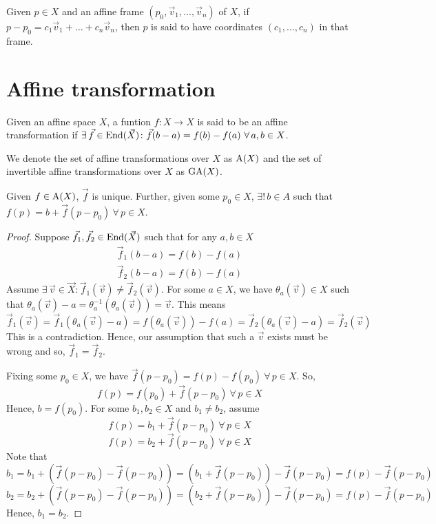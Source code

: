 \noindent
Given $p \in X$ and an affine frame $(p_0,\vec{v}_1,\dots,\vec{v}_n)$ of $X$, if
$p-p_0=c_1\vec{v}_1+\dots+c_n\vec{v}_n$, then $p$ is said to have coordinates
$(c_1,\dots,c_n)$ in that frame.

\section{Affine transformation}

\begin{definition}
    Given an affine space $X$, a funtion $f\colon X \to X$ is said to be an affine
    transformation if $\exists\,\vec{f}\in\operatorname{End}(\vec{X})\colon \vec{f}(b-a)=f(b)-f(a)\ \forall\,a,b \in X$.
\end{definition}

\begin{notation}
    We denote the set of affine transformations over $X$ as $\operatorname{A}(X)$ and the set of
    invertible affine transformations over $X$ as $\operatorname{GA}(X)$.
\end{notation}

\begin{theorem} \label{thm:aff_lin_rep}
    Given $f\in\operatorname{A}(X)$, $\vec{f}$ is unique. Further, given some $p_0 \in X$,
    $\exists!\,b\in{A}$ such that $f(p)=b+\vec{f}(p-p_0)\ \forall\,p \in X$.
\end{theorem}

\begin{proof}
    Suppose $\vec{f}_1,\vec{f}_2\in\operatorname{End}(\vec{X})$ such that for any $a,b \in X$
    \begin{align*}
        \vec{f}_1(b-a)=f(b)-f(a) \\
        \vec{f}_2(b-a)=f(b)-f(a)
    \end{align*}
    Assume $\exists\,\vec{v}\in\vec{X}\colon \vec{f}_1(\vec{v})\neq\vec{f}_2(\vec{v})$.
    For some $a \in X$, we have $\theta_a(\vec{v}) \in X$ such that
    $\theta_a(\vec{v})-a=\theta_a^{-1}(\theta_a(\vec{v}))=\vec{v}$. This means
    \[
        \vec{f}_1(\vec{v}) = \vec{f}_1(\theta_a(\vec{v})-a)
        = f(\theta_a(\vec{v}))-f(a)
        = \vec{f}_2(\theta_a(\vec{v})-a)= \vec{f}_2(\vec{v})
    \]
    This is a contradiction. Hence, our assumption that such a $\vec{v}$ exists
    must be wrong and so, $\vec{f}_1=\vec{f}_2$.
    \vspace{1ex}

    \noindent
    Fixing some $p_0 \in X$, we have
    $\vec{f}(p-p_0)=f(p)-f(p_0)\ \forall\,p \in X$. So,
    \[ f(p)=f(p_0)+\vec{f}(p-p_0)\ \forall\,p \in X \]
    Hence, $b=f(p_0)$. For some $b_1,b_2 \in X$ and $b_1 \neq b_2$, assume
    \[ f(p)=b_1+\vec{f}(p-p_0)\ \forall\,p \in X \]
    \[ f(p)=b_2+\vec{f}(p-p_0)\ \forall\,p \in X \]
    Note that
    \[ b_1=b_1+(\vec{f}(p-p_0)-\vec{f}(p-p_0))=(b_1+\vec{f}(p-p_0))-\vec{f}(p-p_0)=f(p)-\vec{f}(p-p_0) \]
    \[ b_2=b_2+(\vec{f}(p-p_0)-\vec{f}(p-p_0))=(b_2+\vec{f}(p-p_0))-\vec{f}(p-p_0)=f(p)-\vec{f}(p-p_0) \]
    Hence, $b_1=b_2$.
\end{proof}

